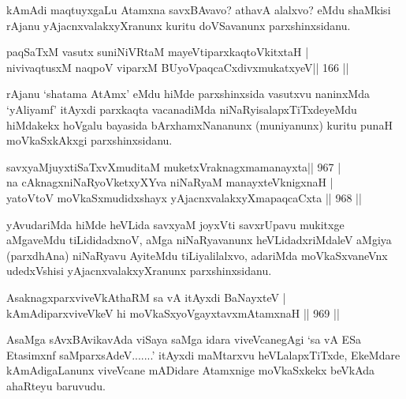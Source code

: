 \begin{artha}
kAmAdi maqtuyxgaLu Atamxna savxBAvavo? athavA alalxvo? eMdu shaMkisi rAjanu yAjacnxvalakxyXranunx kuritu doVSavanunx parxshinxsidanu.
\end{artha}

\begin{shl}
paqSaTxM vasutx suniNiVRtaM mayeVtiparxkaqtoVkitxtaH | \\
nivivaqtusxM naqpoV viparxM BUyoV\s paqcaCxdivxmukatxyeV\hfill ||  166 ||  
\end{shl}

\begin{artha}
rAjanu `shatama AtAmx' eMdu hiMde parxshinxsida vasutxvu naninxMda `yAliyamf' itAyxdi parxkaqta vacanadiMda niNaRyisalapxTiTxdeyeMdu hiMdakekx hoVgalu bayasida bArxhamxNananunx (muniyanunx) kuritu punaH moVkaSxkAkxgi parxshinxsidanu.
\end{artha}


\begin{shl}
savxyaMjuyxtiSaTxvXmuditaM muketxVraknagxmamanayxta\hfill||  967 | \\
na cAknagxniNaRyoVketxyXYva niNaRyaM manayxteV\s knigxnaH | \\
yatoV\s toV moVkaSxmudidxshayx yAjacnxvalakxyXmapaqcaCxta \hfill||  968 ||  
\end{shl}

\begin{artha}
yAvudariMda hiMde heVLida savxyaM joyxVti savxrUpavu mukitxge aMgaveMdu tiLididadxnoV, aMga niNaRyavanunx heVLidadxriMdaleV aMgiya (parxdhAna) niNaRyavu AyiteMdu tiLiyalilalxvo, adariMda moVkaSxvaneVnx udedxVshisi yAjacnxvalakxyXranunx parxshinxsidanu.
\end{artha}


\begin{shl}
AsaknagxparxviveVkAthaRM sa vA itAyxdi BaNayxteV | \\
kAmAdiparxviveVkeV hi moVkaSxyoVgayxtavxmAtamxnaH \hfill||  969 ||  
\end{shl}

\begin{artha}
AsaMga sAvxBAvikavAda viSaya saMga idara viveVcanegAgi `sa vA ESa Etasimxnf saMparxsAdeV.......' itAyxdi maMtarxvu heVLalapxTiTxde, EkeMdare kAmAdigaLanunx viveVcane mADidare Atamxnige moVkaSxkekx beVkAda ahaRteyu baruvudu.
\end{artha}

